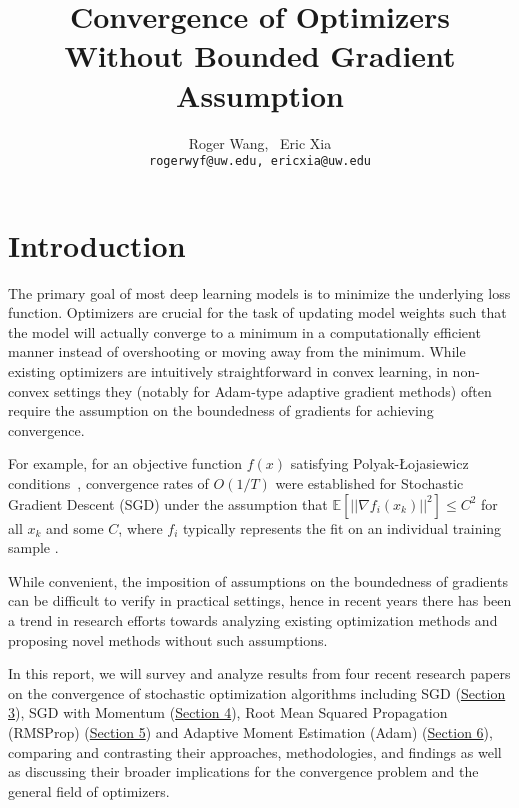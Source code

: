 \documentclass{article}
\title{Convergence of Optimizers Without Bounded Gradient Assumption}
\author{%
  Roger Wang, \ Eric Xia \\
  \texttt{rogerwyf@uw.edu, ericxia@uw.edu} \\
}
\begin{document}
\maketitle


\section{Introduction}

The primary goal of most deep learning models is to minimize the underlying loss function.
Optimizers are crucial for the task of updating model weights such that the model will actually converge to a minimum in a computationally efficient manner instead of overshooting or moving away from the minimum. While existing optimizers are intuitively straightforward in convex learning, in non-convex settings they (notably for Adam-type adaptive gradient methods)
often require the assumption on the boundedness of gradients for achieving convergence.

For example, for an objective function  $f(x)$ satisfying
Polyak-Łojasiewicz conditions~\cite{POLYAK1963864},  convergence rates of $O(1/T)$ were established for Stochastic Gradient Descent (SGD) under the assumption that $\mathbb{E}[||\nabla f_i(x_k)||^2] \leq C^2$ for all $x_k$ and some $C$, where $f_i$ typically represents the fit on an individual training sample \cite{DBLP:journals/corr/KarimiNS16}.

While convenient, the imposition of assumptions on the boundedness of gradients can be difficult to verify in practical settings, hence in recent years there has been a trend in research efforts towards analyzing existing optimization methods and proposing novel methods without such assumptions. 

In this report, we will survey and analyze results from four recent research papers on the convergence of stochastic optimization algorithms including SGD (\hyperref[section3]{Section 3}), SGD with Momentum (\hyperref[section4]{Section 4}), Root Mean Squared Propagation (RMSProp) (\hyperref[section6]{Section 5}) and Adaptive Moment Estimation (Adam) (\hyperref[section7]{Section 6}), comparing and contrasting their approaches, methodologies, and findings as well as discussing their broader implications for the convergence problem and the general field of optimizers.
\end{document}
